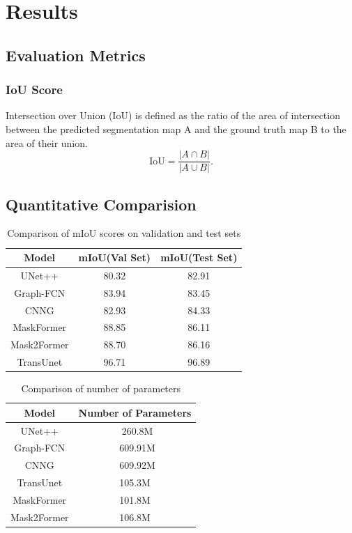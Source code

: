 \section{Results}
\label{sec:results}

\subsection{Evaluation Metrics}
\subsubsection*{IoU Score}
Intersection over Union (IoU) is defined as the ratio of the area of intersection between the predicted segmentation map A and the ground truth map B to the area of their union.
\begin{equation*} 
\text{IoU}=  \frac{|A \cap B|}{|A \cup B|}. 
\end{equation*} 

\subsection{Quantitative Comparision}
\begin{table}[h]
    \centering
    \begin{tabular}{|c|c|c|}
        \hline
        Model & mIoU(Val Set) & mIoU(Test Set) \\
        \hline
        UNet++ & 80.32 & 82.91 \\
        Graph-FCN & 83.94 & 83.45 \\
        CNNG & 82.93 & 84.33 \\
        MaskFormer & 88.85 & 86.11 \\
        Mask2Former & 88.70 & 86.16 \\
        TransUnet & 96.71 & 96.89 \\
        \hline
    \end{tabular}
    \caption{Comparison of mIoU scores on validation and test sets}
    \label{tab:results}
\end{table}

\begin{table}[h]
    \centering
    \begin{tabular}{|c|c|}
        \hline
        Model & Number of Parameters \\
        \hline
        UNet++ & \ 260.8M \\
        Graph-FCN & \ 609.91M \\
        CNNG & \ 609.92M \\
        TransUnet &  105.3M \\
        MaskFormer &  101.8M \\
        Mask2Former &  106.8M \\
        \hline
    \end{tabular}
    \caption{Comparison of number of parameters}
    \label{tab:results}
\end{table}

